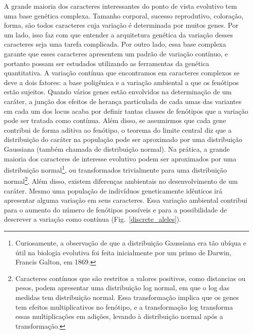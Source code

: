 \begin{refsection}
A grande maioria dos caracteres interessantes do ponto de vista evolutivo tem
uma base genética complexa. Tamanho corporal, sucesso reprodutivo, coloração,
forma, são todos caracteres cuja variação é determinada por muitos genes. Por
um lado, isso faz com que entender a arquitetura genética da variação desses
caracteres seja uma tarefa complicada. Por outro lado, essa base complexa
garante que esses caracteres apresentem um padrão de variação contínuo, e
portanto possam ser estudados utilizando as ferramentas da genética
quantitativa. A variação contínua que encontramos em caracteres complexos se
deve a dois fatores: a base poligênica e a variação ambiental a que os
fenótipos estão sujeitos. Quando vários genes estão envolvidos na determinação
de um caráter, a junção dos efeitos de herança particulada de cada umas das
variantes em cada um dos locus acaba por definir tantas classes de fenótipos
que a variação pode ser tratada como contínua. Além disso, se assumirmos que
cada gene contribui de forma aditiva ao fenótipo, o teorema do limite central
diz que a distribuição do caráter na população pode ser aproximado por uma
distribuição Gaussiana (também chamada de distribuição normal). Na prática, a
grande maioria dos caracteres de interesse evolutivo podem ser aproximados por
uma distribuição normal\footnote{Curiosamente, a observação de que a
distribuição Gaussiana era tão ubíqua e útil na biologia evolutiva foi feita
inicialmente por um primo de Darwin, Francis Galton, em 1869.}, ou
transformados trivialmente para uma distribuição normal\footnote{Caracteres
contínuos que são restritos a valores positivos, como distancias ou pesos,
podem apresentar uma distribuição log normal, em que o log das medidas tem
distribuição normal. Essa transformação implica que os genes tem efeitos
multiplicativos no fenótipo, e a transformação log transforma essas
multiplicações em adições, levando à distribuição normal após a
transformação.}. Além disso, existem diferenças ambientais no desenvolvimento
de um caráter. Mesmo uma população de indivíduos geneticamente idênticos irá
apresentar alguma variação em seus caracteres. Essa variação ambiental
contribui para o aumento do número de fenótipos possíveis e para a
possibilidade de descrever a variação como contínua
(Fig.~\ref{discrete_aleles}).


\end{refsection}
